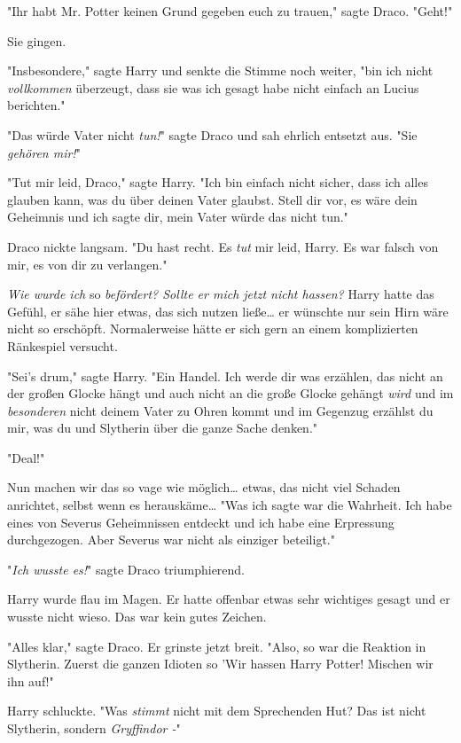 {"Ihr habt Mr. Potter keinen Grund gegeben euch zu trauen," sagte Draco. "Geht!"

Sie gingen.

"Insbesondere," sagte Harry und senkte die Stimme noch weiter, "bin ich nicht \emph{vollkommen} überzeugt, dass sie was ich gesagt habe nicht einfach an Lucius berichten."

"Das würde Vater nicht \emph{tun!}" sagte Draco und sah ehrlich entsetzt aus. "Sie \emph{gehören mir!}"

"Tut mir leid, Draco," sagte Harry. "Ich bin einfach nicht sicher, dass ich alles glauben kann, was du über deinen Vater glaubst. Stell dir vor, es wäre dein Geheimnis und ich sagte dir, mein Vater würde das nicht tun."

Draco nickte langsam. "Du hast recht. Es \emph{tut} mir leid, Harry. Es war falsch von mir, es von dir zu verlangen."

\emph{Wie wurde ich} so \emph{befördert? Sollte er mich jetzt nicht hassen?} Harry hatte das Gefühl, er sähe hier etwas, das sich nutzen ließe… er wünschte nur sein Hirn wäre nicht so erschöpft. Normalerweise hätte er sich gern an einem komplizierten Ränkespiel versucht.

"Sei's drum," sagte Harry. "Ein Handel. Ich werde dir was erzählen, das nicht an der großen Glocke hängt und auch nicht an die große Glocke gehängt \emph{wird} und im \emph{besonderen} nicht deinem Vater zu Ohren kommt und im Gegenzug erzählst du mir, was du und Slytherin über die ganze Sache denken."

"Deal!"

Nun machen wir das so vage wie möglich… etwas, das nicht viel Schaden anrichtet, selbst wenn es herauskäme… "Was ich sagte war die Wahrheit. Ich habe eines von Severus Geheimnissen entdeckt und ich habe eine Erpressung durchgezogen. Aber Severus war nicht als einziger beteiligt."

"\emph{Ich wusste es!}" sagte Draco triumphierend.

Harry wurde flau im Magen. Er hatte offenbar etwas sehr wichtiges gesagt und er wusste nicht wieso. Das war kein gutes Zeichen.

"Alles klar," sagte Draco. Er grinste jetzt breit. "Also, so war die Reaktion in Slytherin. Zuerst die ganzen Idioten so 'Wir hassen Harry Potter! Mischen wir ihn auf!"

Harry schluckte. "Was \emph{stimmt} nicht mit dem Sprechenden Hut? Das ist nicht Slytherin, sondern \emph{Gryffindor -}"

}
